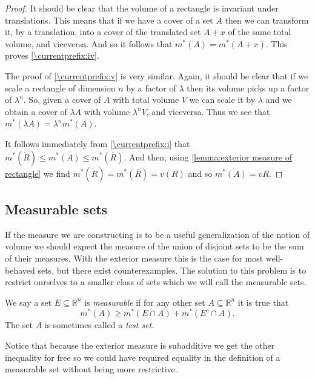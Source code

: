 \documentclass[12pt,oneside]{book}
\newcommand{\localref}[1]{\ref{\currentprefix:#1}}
\numberwithin{table}{section}
\numberwithin{equation}{section}
\numberwithin{figure}{section}
\newcommand{\R}{\mathbb{R}}
\newcommand{\ext}[1]{m^* \! \left( #1 \right)}
\begin{document}
{\begin{proof}
		It should be clear that the volume of a rectangle is invariant under translations. This means that if we have a cover of a set \( A \) then we can transform it, by a translation, into a cover of the translated set \( A + x \) of the same total volume, and viceversa. And so it follows that \( \ext{A} = \ext{A + x} \). This proves \localref{iv}.

		The proof of \localref{v} is very similar. Again, it should be clear that if we scale a rectangle of dimension \( n \) by a factor of \( \lambda \) then its volume picks up a factor of \( \lambda^n \). So, given a cover of \( A \) with total volume \( V \) we can scale it by \( \lambda \) and we obtain a cover of \( \lambda A \) with volume \( \lambda^n V \), and viceversa. Thus we see that \( \ext{\lambda A} = \lambda^n \ext{A} \).

		It follows immediately from \localref{i} that \( \ext{\mathring{R}} \leq \ext{A} \leq \ext{\bar{R}} \). And then, using \cref{lemma:exterior measure of rectangle} we find \( \ext{\mathring{R}} = \ext{\bar{R}} = v(R) \) and so \( \ext{A} = v{R} \). 
	\end{proof}
}

\subsection{Measurable sets}
If the measure we are constructing is to be a useful generalization of the notion of volume we should expect the measure of the union of disjoint sets to be the sum of their measures. With the exterior measure this is the case for most well-behaved sets, but there exist counterexamples. The solution to this problem is to restrict ourselves to a smaller class of sets which we will call the measurable sets.
\begin{definition}
	We say a set \( E \subseteq \R^n \) is \emph{measurable} if for any other set \( A \subseteq \R^n \) it is true that
	\begin{equation*}
		\ext{A} \geq \ext{E \cap A} + \ext{E^c \cap A}.
	\end{equation*}
The set \( A \) is sometimes called a \emph{test set}.
\end{definition}

Notice that because the exterior measure is subadditive we get the other inequality for free so we could have required equality in the definition of a measurable set without being more restrictive.
\end{document}
